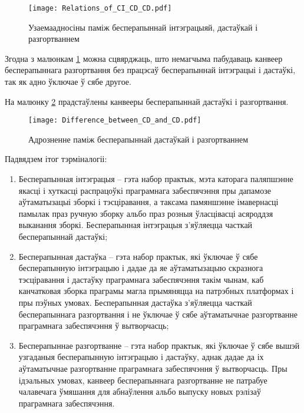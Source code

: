 \begin{figure}[h!]
    \centering
    \texttt{[image: Relations\_of\_CI\_CD\_CD.pdf]}
    \caption{Узаемаадносіны паміж бесперапыннай
             інтэграцыяй, дастаўкай і разгортваннем}
    \label{figure:relations of CI, CD, CD}
\end{figure}

Згодна з малюнкам \ref{figure:relations of CI, CD, CD}
можна сцвярджаць, што немагчыма пабудаваць канвеер бесперапыннага
разгортвання без працэсаў бесперапыннай інтэграцыі і дастаўкі,
так як адно ўключае ў сябе другое.

На малюнку \ref{figure:Difference_between_CD_and_CD}
прадстаўлены канвееры бесперапыннай дастаўкі і разгортвання.

\begin{figure}[h!]
    \centering
    \texttt{[image: Difference\_between\_CD\_and\_CD.pdf]}
    \caption{Адрозненне паміж бесперапыннай дастаўкай і разгортваннем}
    \label{figure:Difference_between_CD_and_CD}
\end{figure}

Падвядзем ітог тэрміналогіі:
\begin{enumerate}
    \item Бесперапынная інтэграцыя -- гэта набор практык,
          мэта каторага паляпшэнне якасці і хуткасці распрацоўкі
          праграмнага забеспячэння пры дапамозе аўтаматызацыі
          зборкі і тэсціравання, а таксама памяншэнне імавернасці
          памылак праз ручную зборку альбо праз розныя
          ўласцівасці асяроддзя выканання зборкі.
          Бесперапынная інтэграцыя з'яўляецца часткай бесперапыннай
          дастаўкі;
    \item Бесперапынная дастаўка -- гэта набор практык,
          які ўключае ў сябе бесперапынную інтэграцыю і дадае 
          да яе аўтаматызацыю скразнога тэсціравання і дастаўку
          праграмнага забеспячэння такім чынам, каб канчатковая
          зборка праграмы магла прымяняцца на патрэбных платформах
          і пры пэўных умовах.
          Бесперапынная дастаўка з'яўляецца часткай бесперапыннага
          разгортвання і не ўключае ў сябе аўтаматычнае
          разгортванне праграмнага забеспячэння ў вытворчасць;
    \item Бесперапыннае разгортванне -- гэта набор практык, які
          ўключае ў сябе вышэй узгаданыя бесперапынную інтэграцыю
          і дастаўку, аднак дадае да іх аўтаматычнае разгортванне
          праграмнага забеспячэння ў вытворчасць.
          Пры ідэальных умовах, канвеер бесперапыннага разгортванне
          не патрабуе чалавечага ўмяшання для абнаўлення альбо выпуску
          новых рэлізаў праг\-рам\-на\-га забеспячэння.
\end{enumerate}

